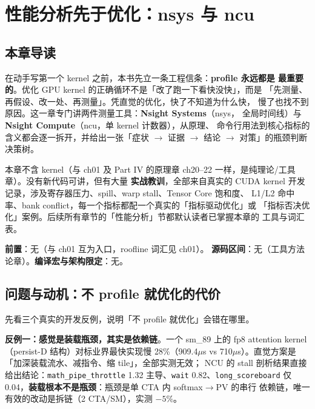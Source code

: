\chapter{性能分析先于优化：nsys 与 ncu}\label{ch:00}

\section{本章导读}

在动手写第一个 kernel 之前，本书先立一条工程信条：\textbf{profile 永远都是
最重要的}。优化 GPU kernel 的正确循环不是「改了跑一下看快没快」，而是
「先测量、再假设、改一处、再测量」。凭直觉的优化，快了不知道为什么快，
慢了也找不到原因。这一章专门讲两件测量工具：\textbf{Nsight Systems}（nsys，
全局时间线）与 \textbf{Nsight Compute}（ncu，单 kernel 计数器），从原理、
命令行用法到核心指标的含义都会逐一拆开，并给出一张「症状 $\to$ 证据 $\to$ 结论 $\to$
对策」的瓶颈判断决策树。

本章不含 kernel（与 ch01 及 Part IV 的原理章 ch20--22 一样，是纯理论/工具章）。没有新代码可讲，但有大量
\textbf{实战教训}，全部来自真实的 CUDA kernel 开发记录，涉及寄存器压力、spill、warp stall、Tensor Core 饱和度、
L1/L2 命中率、bank conflict，每一个指标都配一个真实的「指标驱动优化」或
「指标否决优化」案例。后续所有章节的「性能分析」节都默认读者已掌握本章的
工具与词汇表。

\textbf{前置}：无（与 ch01 互为入口，roofline 词汇见 ch01）。
\textbf{源码区间}：无（工具方法论章）。\textbf{编译宏与架构限定}：无。

\section{问题与动机：不 profile 就优化的代价}

先看三个真实的开发反例，说明「不 profile 就优化」会错在哪里。

\textbf{反例一：感觉是装载瓶颈，其实是依赖链}。一个 sm\_89 上的 fp8
attention kernel（persist-D 结构）对标业界最快实现慢 28\%（909.4$\mu$s vs
710$\mu$s）。直觉方案是「加深装载流水、减指令、缩 tile」，全部实测无效；
NCU 的 stall 剖析结果直接给出结论：\texttt{math\_\allowbreak{}pipe\_\allowbreak{}throttle} 1.32
主导、\texttt{wait} 0.82、\texttt{long\_\allowbreak{}scoreboard} 仅
0.04，\textbf{装载根本不是瓶颈}：瓶颈是单 CTA 内 softmax$\to$PV 的串行
依赖链，唯一有效的改动是拆链（2 CTA/SM），实测 $-5\%$。

